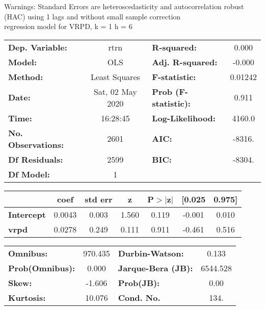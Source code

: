 Warnings: \newline
 [1] Standard Errors are heteroscedasticity and autocorrelation robust (HAC) using 1 lags and without small sample correction\\ 

regression model for VRPD, k = 1 h = 6\begin{center}
\begin{tabular}{lclc}
\toprule
\textbf{Dep. Variable:}    &       rtrn       & \textbf{  R-squared:         } &     0.000   \\
\textbf{Model:}            &       OLS        & \textbf{  Adj. R-squared:    } &    -0.000   \\
\textbf{Method:}           &  Least Squares   & \textbf{  F-statistic:       } &   0.01242   \\
\textbf{Date:}             & Sat, 02 May 2020 & \textbf{  Prob (F-statistic):} &    0.911    \\
\textbf{Time:}             &     16:28:45     & \textbf{  Log-Likelihood:    } &    4160.0   \\
\textbf{No. Observations:} &        2601      & \textbf{  AIC:               } &    -8316.   \\
\textbf{Df Residuals:}     &        2599      & \textbf{  BIC:               } &    -8304.   \\
\textbf{Df Model:}         &           1      & \textbf{                     } &             \\
\bottomrule
\end{tabular}
\begin{tabular}{lcccccc}
                   & \textbf{coef} & \textbf{std err} & \textbf{z} & \textbf{P$> |$z$|$} & \textbf{[0.025} & \textbf{0.975]}  \\
\midrule
\textbf{Intercept} &       0.0043  &        0.003     &     1.560  &         0.119        &       -0.001    &        0.010     \\
\textbf{vrpd}      &       0.0278  &        0.249     &     0.111  &         0.911        &       -0.461    &        0.516     \\
\bottomrule
\end{tabular}
\begin{tabular}{lclc}
\textbf{Omnibus:}       & 970.435 & \textbf{  Durbin-Watson:     } &    0.133  \\
\textbf{Prob(Omnibus):} &   0.000 & \textbf{  Jarque-Bera (JB):  } & 6544.528  \\
\textbf{Skew:}          &  -1.606 & \textbf{  Prob(JB):          } &     0.00  \\
\textbf{Kurtosis:}      &  10.076 & \textbf{  Cond. No.          } &     134.  \\
\bottomrule
\end{tabular}
\end{center}

